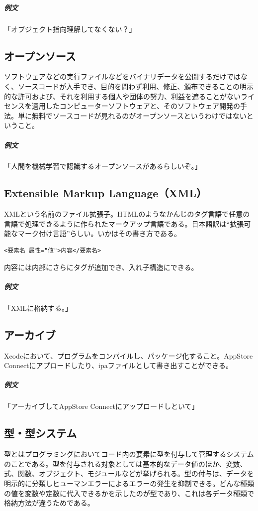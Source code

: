\documentclass[dvipdfmx,jb5]{jreport}
\begin{document}
\subparagraph{例文} 「オブジェクト指向理解してなくない？」

\subsection{オープンソース}
ソフトウェアなどの実行ファイルなどをバイナリデータを公開するだけではなく、ソースコードが入手でき、目的を問わず利用、修正、頒布できることの明示的な許可および、それを利用する個人や団体の努力、利益を遮ることがないライセンスを適用したコンピューターソフトウェアと、そのソフトウェア開発の手法。単に無料でソースコードが見れるのがオープンソースというわけではないということ。

\subparagraph{例文} 「人間を機械学習で認識するオープンソースがあるらしいぞ。」

\subsection{Extensible Markup Language（XML）}
XMLという名前のファイル拡張子。HTMLのようなかんじのタグ言語で任意の言語で処理できるように作られたマークアップ言語である。日本語訳は``拡張可能なマーク付け言語''らしい。いかはその書き方である。

\lstset{language=bash}
\begin{lstlisting}
<要素名 属性="値">内容</要素名>
\end{lstlisting}

内容には内部にさらにタグが追加でき、入れ子構造にできる。

\subparagraph{例文} 「XMLに格納する。」

\subsection{アーカイブ}
Xcodeにおいて、プログラムをコンパイルし、パッケージ化すること。AppStore Connectにアプロードしたり、ipaファイルとして書き出すことができる。

\subparagraph{例文} 「アーカイブしてAppStore Connectにアップロードしといて」

\subsection{型・型システム}
型とはプログラミングにおいてコード内の要素に型を付与して管理するシステムのことである。型を付与される対象としては基本的なデータ値のほか、変数、式、関数、オブジェクト、モジュールなどが挙げられる。型の付与は、データを明示的に分類しヒューマンエラーによるエラーの発生を抑制できる。どんな種類の値を変数や定数に代入できるかを示したのが型であり、これは各データ種類で格納方法が違うためである。
\end{document}
